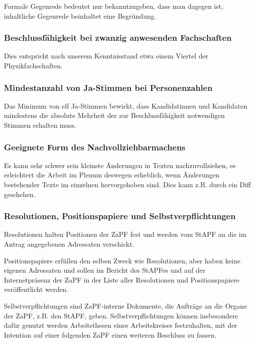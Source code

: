 Formale Gegenrede bedeutet nur bekanntzugeben, dass man dagegen ist, inhaltliche
Gegenrede beinhaltet eine Begründung.


\subsubsection*{Beschlussfähigkeit bei zwanzig anwesenden Fachschaften%
  \label{beschlussfahigkeit-bei-zwanzig-anwesenden-fachschaften}%
}

Dies entspricht nach unserem Kenntnisstand etwa einem Viertel der Physikfachschaften.


\subsubsection*{Mindestanzahl von Ja-Stimmen bei Personenzahlen%
  \label{mindestanzahl-von-ja-stimmen-bei-personenzahlen}%
}

Das Minimum von elf Ja-Stimmen bewirkt, dass Kandidatinnen und Kandidaten
mindestens die absolute Mehrheit der zur Beschlussfähigkeit notwendigen Stimmen
erhalten muss.


\subsubsection*{Geeignete Form des Nachvollziehbarmachens%
  \label{geeignete-form-des-nachvollziehbarmachens}%
}

Es kann sehr schwer sein kleinste Änderungen in Texten nachzuvollziehen, es
erleichtert die Arbeit im Plenum deswegen erheblich, wenn Änderungen bestehender
Texte im einzelnen hervorgehoben sind. Dies kann z.B. durch ein Diff geschehen.


\subsubsection*{Resolutionen, Positionspapiere und Selbstverpflichtungen%
  \label{resolutionen-positionspapiere-und-selbstverpflichtungen}%
}

Resolutionen halten Positionen der ZaPF fest und werden vom StAPF an die im
Antrag angegebenen Adressaten verschickt.

Positionspapiere erfüllen den selben Zweck wie Resolutionen, aber haben keine
eigenen Adressaten und sollen im Bericht des StAPFes und auf der
Internetpräsenz der ZaPF in der Liste aller Resolutionen und Positionspapiere
veröffentlicht werden.

Selbstverpflichtungen sind ZaPF-interne Dokumente, die Aufträge an die Organe
der ZaPF, z.B. den StAPF, geben. Selbstverpflichtungen können insbesondere dafür
genutzt werden Arbeitsthesen eines Arbeitskreises festzuhalten, mit der
Intention auf einer folgenden ZaPF einen weiteren Beschluss zu fassen.


